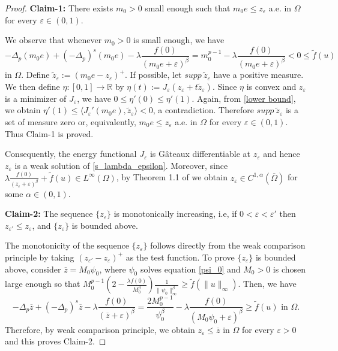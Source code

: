 \documentclass[reqno,oneside]{amsart}
\theoremstyle{definition}
\theoremstyle{remark}
\numberwithin{equation}{section}
\newcommand{\p}{\Delta_p}
\newcommand{\ps}{(-\Delta_p)^s}
\newcommand{\la} {\lambda}
\newcommand{\ba}{\beta}
\newcommand{\Om} {\Omega}
\newcommand{\sr}{\mathbb{R}}
\newcommand{\rar}{\rightarrow}
\newcommand{\omc}{(\overline{\Om})}
\newcommand{\ftil}{\tilde{f}}
\begin{document}
\begin{proof}
    \noindent\textbf{Claim-1:} There exists $m_0 >0$ small enough such that $m_0 e \leq z_{\varepsilon}$ a.e. in $\Om$ for every $\varepsilon \in (0,1)$.
    
    We observe that whenever $m_0 >0$ is small enough, we have
    \begin{equation}\label{lower bound}
        -\p (m_0 e) + \ps (m_0 e) - \la \frac{f(0)}{\left(m_0 e+\varepsilon\right)^{\ba}} = m_0^{p-1} - \la \frac{f(0)}{\left(m_0 e+\varepsilon\right)^{\ba}} < 0 \leq \ftil (u)
    \end{equation}
    in $\Om$. Define $\tilde{z}_{\varepsilon}:= (m_0 e - z_{\varepsilon})^+$. If possible, let $supp\ \tilde{z}_{\varepsilon}$ have a positive measure. We then define $\eta: [0,1] \rar \sr$ by $\eta(t):= J_{\varepsilon} \left(z_{\varepsilon} + t\tilde{z}_{\varepsilon} \right)$. Since $\eta$ is convex and $z_{\varepsilon}$ is a minimizer of $J_{\varepsilon}$, we have $0\leq \eta' (0) \leq \eta' (1)$. Again, from \eqref{lower bound}, we obtain $\eta'(1) \leq \langle J_{\varepsilon}' (m_0 e), \tilde{z}_{\varepsilon} \rangle <0$, a contradiction. Therefore $supp\ \tilde{z}_{\varepsilon}$ is a set of measure zero or, equivalently, $m_0 e \leq z_{\varepsilon}$ a.e. in $\Om$ for every $\varepsilon \in (0,1)$. Thus Claim-1 is proved.

    Consequently, the energy functional $J_{\varepsilon} $ is G\^ateaux differentiable at $z_{\varepsilon}$ and hence $z_{\varepsilon}$ is a weak solution of \eqref{s_lambda_epsilon}. Moreover, since $\la \frac{f(0)}{\left(z_{\varepsilon} + \varepsilon \right)^{\ba}} + \tilde{f}(u) \in L^{\infty}(\Om) $, by Theorem 1.1 of \cite{antonini2025global} we obtain $z_{\varepsilon} \in C^{1,\alpha} \omc$ for some $\alpha\in (0,1)$.

    \noindent\textbf{Claim-2:} The sequence $\{z_{\varepsilon}\}$ is monotonically increasing, i.e, if $0<\varepsilon<\varepsilon'$ then $z_{\varepsilon'}\leq z_{\varepsilon}$, and $\{z_{\varepsilon}\}$ is bounded above.

    The monotonicity of the sequence $\{z_{\varepsilon}\}$ follows directly from the weak comparison principle by taking $\left(z_{\varepsilon'} - z_{\varepsilon}\right)^+$ as the test function. To prove $\{z_{\varepsilon}\}$ is bounded above, consider $\overline{z}= M_0 \psi_0$, where $\psi_0$ solves equation \eqref{psi_0} and $M_0 >0$ is chosen large enough so that $M_0^{p-1} \left( 2 - \frac{\la f(0)}{M_0^{\ba}} \right) \frac{1}{\|\psi_0\|_{\infty}^{\ba}} \geq \ftil \left(\|u\|_{\infty}\right)$. Then, we have
    \begin{equation*}
        -\p \overline{z} + \ps \overline{z} -\la \frac{f(0)}{\left(\overline{z} + \varepsilon\right)^{\ba}} = \frac{2M_0^{p-1}}{\psi_0^{\ba}} - \la \frac{f(0)}{\left(M_0\psi_0 + \varepsilon\right)^{\ba}}\geq \ftil (u) \text{ in } \Om.
    \end{equation*}
    Therefore, by weak comparison principle, we obtain $z_{\varepsilon} \leq \overline{z}$ in $\Om$ for every $\varepsilon>0$ and this proves Claim-2.


\end{proof}
\end{document}
